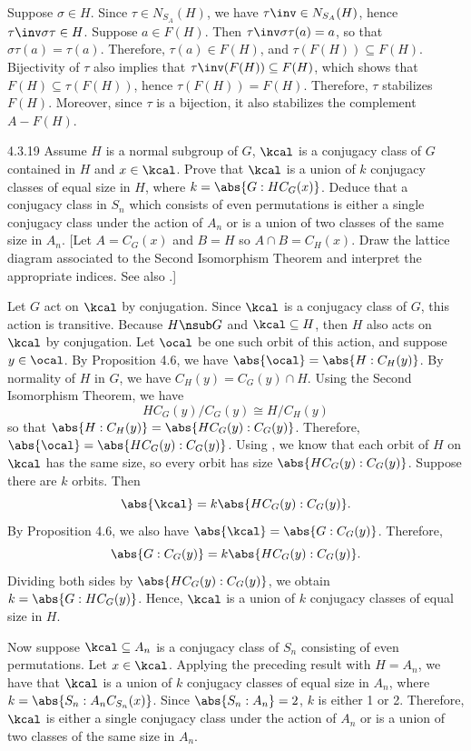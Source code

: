 \begin{sol}
	Suppose $\sigma \in H$.
	Since $\tau \in N_{S_A}(H)$, we have $\tau\inv \in N_{S_A}(H)$, hence $\tau\inv\sigma\tau \in H$.
	Suppose $a \in F(H)$.
	Then $\tau\inv\sigma\tau(a) = a$, so that $\sigma\tau(a) = \tau(a)$.
	Therefore, $\tau(a) \in F(H)$, and $\tau(F(H)) \subseteq F(H)$.
	Bijectivity of $\tau$ also implies that $\tau\inv(F(H)) \subseteq F(H)$, which shows that $F(H) \subseteq \tau(F(H))$, hence $\tau(F(H)) = F(H)$.
	Therefore, $\tau$ stabilizes $F(H)$.
	Moreover, since $\tau$ is a bijection, it also stabilizes the complement $A - F(H)$.
\end{sol}

\begin{exercise}{4.3.19}
	Assume $H$ is a normal subgroup of $G$, $\kcal$ is a conjugacy class of $G$ contained in $H$ and $x \in \kcal$.
	Prove that $\kcal$ is a union of $k$ conjugacy classes of equal size in $H$, where $k = \abs{G : HC_G(x)}$.
	Deduce that a conjugacy class in $S_n$ which consists of even permutations is either a single conjugacy class under the action of $A_n$ or is a union of two classes of the same size in $A_n$. [Let $A = C_G(x)$ and $B = H$ so $A \cap B = C_H(x)$.
	Draw the lattice diagram associated to the Second Isomorphism Theorem and interpret the appropriate indices.
	See also .]
\end{exercise}

\begin{sol}
	Let $G$ act on $\kcal$ by conjugation.
	Since $\kcal$ is a conjugacy class of $G$, this action is transitive.
	Because $H \nsub G$ and $\kcal \subseteq H$, then $H$ also acts on $\kcal$ by conjugation.
	Let $\ocal$ be one such orbit of this action, and suppose $y \in \ocal$.
	By Proposition 4.6, we have $\abs{\ocal} = \abs{H : C_H(y)}$.
	By normality of $H$ in $G$, we have $C_H(y) = C_G(y) \cap H$.
	Using the Second Isomorphism Theorem, we have
	\[
		HC_G(y)/C_G(y) \cong H/C_H(y)
	\]
	so that $\abs{H : C_H(y)} = \abs{HC_G(y) : C_G(y)}$.
	Therefore, $\abs{\ocal} = \abs{HC_G(y) : C_G(y)}$.
	Using , we know that each orbit of $H$ on $\kcal$ has the same size, so every orbit has size $\abs{HC_G(y) : C_G(y)}$.
	Suppose there are $k$ orbits.
	Then
	\[
		\abs{\kcal} = k\abs{HC_G(y) : C_G(y)}.
	\]
	By Proposition 4.6, we also have $\abs{\kcal} = \abs{G : C_G(y)}$.
	Therefore,
	\[
		\abs{G : C_G(y)} = k\abs{HC_G(y) : C_G(y)}.
	\]
	Dividing both sides by $\abs{HC_G(y) : C_G(y)}$, we obtain $k = \abs{G : HC_G(y)}$.
	Hence, $\kcal$ is a union of $k$ conjugacy classes of equal size in $H$.

	Now suppose $\kcal \subseteq A_n$ is a conjugacy class of $S_n$ consisting of even permutations.
	Let $x \in \kcal$.
	Applying the preceding result with $H = A_n$, we have that $\kcal$ is a union of $k$ conjugacy classes of equal size in $A_n$, where $k = \abs{S_n : A_nC_{S_n}(x)}$.
	Since $\abs{S_n : A_n} = 2$, $k$ is either 1 or 2.
	Therefore, $\kcal$ is either a single conjugacy class under the action of $A_n$ or is a union of two classes of the same size in $A_n$.
\end{sol}

